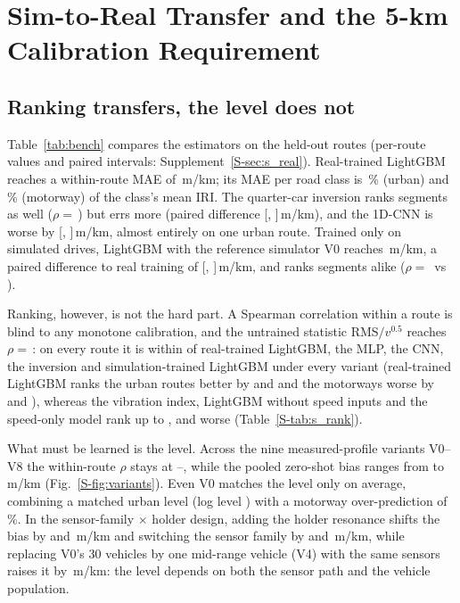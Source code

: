 \section{Sim-to-Real Transfer and the 5-km Calibration Requirement}
\label{sec:results}



\subsection{Ranking transfers, the level does not}
\label{sec:res_zero}
Table~\ref{tab:bench} compares the estimators on the held-out routes (per-route values and paired intervals: Supplement~\ref{S-sec:s_real}).
Real-trained LightGBM reaches a within-route MAE of \vrGbmMaeWithin\,m/km; its MAE per road class is \reGbmUrban\,\% (urban) and \reGbmMotorway\,\% (motorway) of the class's mean IRI.
The quarter-car inversion ranks segments as well ($\rho=$\,\vrInvRhoWithin) but errs more (paired difference \vrInvDfive{} [\vrInvDfiveLo, \vrInvDfiveHi]\,m/km), and the 1D-CNN is worse by \vrCnnDfive{} [\vrCnnDfiveLo, \vrCnnDfiveHi]\,m/km, almost entirely on one urban route.
Trained only on simulated drives, LightGBM with the reference simulator V0 reaches \vrSimVzeroMaeWithin\,m/km, a paired difference to real training of \vrSimVzeroDfive{} [\vrSimVzeroDfiveLo, \vrSimVzeroDfiveHi]\,m/km, and ranks segments alike ($\rho=$\,\vrSimVzeroRhoWithin{} vs \vrGbmRhoWithin).

Ranking, however, is not the hard part.
A Spearman correlation within a route is blind to any monotone calibration, and the untrained statistic RMS$/v^{0.5}$ reaches $\rho=$\,\rkHalfRho: on every route it is within \rpAbsMax{} of real-trained LightGBM, the MLP, the CNN, the inversion and simulation-trained LightGBM under every variant (real-trained LightGBM ranks the urban routes better by \rpRhoRealCphOne{} and \rpRhoRealCphSix{} and the motorways worse by \rpRhoRealMwThree{} and \rpRhoRealMwThirteen), whereas the vibration index, LightGBM without speed inputs and the speed-only model rank up to \rkIdxGapMax, \rkNoSpeedGapMax{} and \rkSpeedOnlyGapMax{} worse (Table~\ref{S-tab:s_rank}).

What must be learned is the level.
Across the nine measured-profile variants V0--V8 the within-route $\rho$ stays at \vvRhoMin--\vvRhoMax, while the pooled zero-shot bias ranges from \vvBiasMin{} to \vvBiasMax\,m/km (Fig.~\ref{S-fig:variants}).
Even V0 matches the level only on average, combining a matched urban level (log level \ldVzeroUrban) with a motorway over-prediction of \ldVzeroPctMotorwayAbs\,\%.
In the sensor-family $\times$ holder design, adding the holder resonance shifts the bias by \vvHolderEffTele{} and \vvHolderEffPhone\,m/km and switching the sensor family by \vvFamilyEffRigid{} and \vvFamilyEffHolder\,m/km, while replacing V0's 30 vehicles by one mid-range vehicle (V4) with the same sensors raises it by \vpVehicleEffBias\,m/km: the level depends on both the sensor path and the vehicle population.

